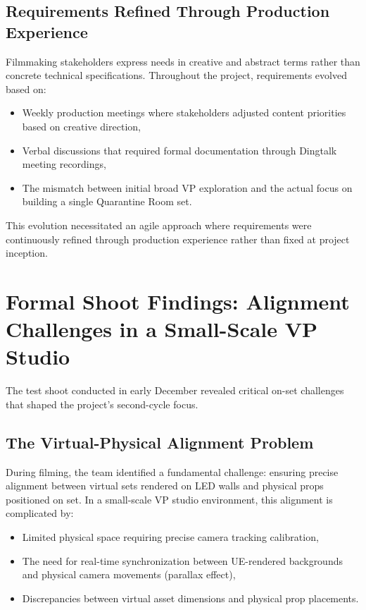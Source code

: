\documentclass[12pt,a4paper]{report}
\begin{document}
\subsection{Requirements Refined Through Production Experience}
Filmmaking stakeholders express needs in creative and abstract terms rather than concrete technical specifications. Throughout the project, requirements evolved based on:
\begin{itemize}
    \item Weekly production meetings where stakeholders adjusted content priorities based on creative direction,
    \item Verbal discussions that required formal documentation through Dingtalk meeting recordings,
    \item The mismatch between initial broad VP exploration and the actual focus on building a single Quarantine Room set.
\end{itemize}
This evolution necessitated an agile approach where requirements were continuously refined through production experience rather than fixed at project inception.


\section{Formal Shoot Findings: Alignment Challenges in a Small-Scale VP Studio}

The test shoot conducted in early December revealed critical on-set challenges that shaped the project's second-cycle focus.

\subsection{The Virtual-Physical Alignment Problem}
During filming, the team identified a fundamental challenge: ensuring precise alignment between virtual sets rendered on LED walls and physical props positioned on set. In a small-scale VP studio environment, this alignment is complicated by:
\begin{itemize}
    \item Limited physical space requiring precise camera tracking calibration,
    \item The need for real-time synchronization between UE-rendered backgrounds and physical camera movements (parallax effect),
    \item Discrepancies between virtual asset dimensions and physical prop placements.
\end{itemize}
\end{document}
